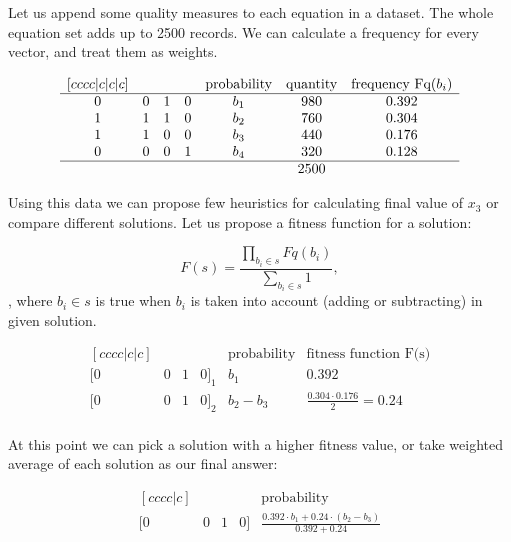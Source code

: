 Let us append some quality measures to each equation in a dataset.
The whole equation set adds up to 2500 records.
We can calculate a frequency for every vector, and treat them as weights.

\begin{equation}
\begin{matrix}[cccc|c|c|c]
     &  &  &  & \mbox{probability} & \mbox{quantity} & \mbox{frequency Fq($b_i$)} \\
    \hline
    0 & 0 & 1 & 0 & b_1 & 980 & 0.392 \\
    1 & 1 & 1 & 0 & b_2 & 760 & 0.304 \\ 
    1 & 1 & 0 & 0 & b_3 & 440 & 0.176 \\ 
    0 & 0 & 0 & 1 & b_4 & 320 & 0.128 \\ 
    \hline
     &  &  &  &  & 2500 & \\ 
\end{matrix}
\end{equation}

Using this data we can propose few heuristics for calculating final value of $x_3$ or compare different solutions.
Let us propose a fitness function for a solution:

\begin{equation}
    F(s) = \frac{\displaystyle\prod_{b_{i} \in s} Fq(b_i)}{ \displaystyle\sum_{b_i \in s}1},
\end{equation},
where $b_i \in s$ is true when $b_i$ is taken into account (adding or subtracting) in given solution.

\begin{equation}
\begin{matrix}[cccc|c|c]
     &  &  &  & \mbox{probability} & \mbox{fitness function F(s)} \\
    \hline
    [0 & 0 & 1 & 0]_1 & b_1 & 0.392 \\
    [0 & 0 & 1 & 0]_2 & b_2 - b_3 & \frac{0.304 \cdot 0.176}{2} = 0.24 \\ 
\end{matrix}
\end{equation}

At this point we can pick a solution with a higher fitness value, or take weighted average of each solution as our final answer:

\begin{equation}
\begin{matrix}[cccc|c]
     &  &  &  & \mbox{probability}\\
    \hline
    [0 & 0 & 1 & 0] & \frac{0.392 \cdot b_1 + 0.24 \cdot (b_2 - b_3)}{0.392+0.24}\\
\end{matrix}
\end{equation}

